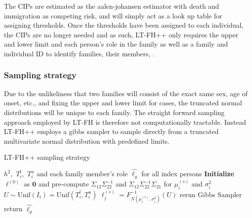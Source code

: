 The CIPs are estimated as the aalen-johansen estimator with death and immigration as competing risk, and will simply act as a look up table for assigning thresholds. Once the thresholds have been assigned to each individual, the CIPs are no longer needed and as such, LT-FH++ only requires the upper and lower limit and each person's role in the family as well as a family and individual ID to identify families, their members, . 

\subsubsection{Sampling strategy}

Due to the unlikeliness that two families will consist of the exact same sex, age of onset, etc., and fixing the upper and lower limit for cases, the truncated normal distributions will be unique to each family. The straight forward sampling approach employed by LT-FH is therefore not computationally tractable. Instead LT-FH++ employs a gibbs sampler to sample directly from a truncated multivariate normal distribution with predefined limits. 


\begin{algorithm}
\caption{LT-FH++ sampling strategy}
\begin{algorithmic}[1]
\INPUT $ h^2,$ $T_{i}^l,$ $T_{i}^u$ and each family member's role 
\OUTPUT $ \hat{\ell_g} $ for all index persons
\GIBBS
\STATE \textbf{Initialize} $\ell^{(0)}$ as $ \mathbf{0} $ and pre-compute $ \Sigma_{12} \Sigma_{22}^{-1} $ and $ \Sigma_{12} \Sigma_{22}^{-1} \Sigma_{21} $ for $ \mu_i^{(s)} $ and $ \sigma^2_i $
	  
	\STATE $ U \sim \text{Unif}(I_i) = \text{Unif}(T_i^l, T_i^u) $ 
	\STATE $ \ell_j^{(s)} = F^{-1}_{N(\mu_i^{(s)}, \sigma_i^2)}(U) $
	\ENDFOR
\ENDFOR
{}
\STATE rerun Gibbs Sampler
\ELSE
\STATE return  $ \hat{\ell_g} $
\ENDIF
\end{algorithmic}
\end{algorithm}


